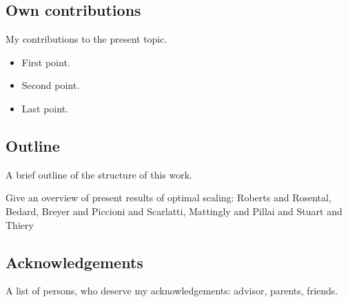 \subsection*{Own contributions}

My contributions to the present topic.
\begin{itemize}
 \item First point.
 \item Second point.
 \item Last point.
\end{itemize}


\subsection*{Outline}

A brief outline of the structure of this work.

Give an overview of present results of optimal scaling: Roberts and Rosental, Bedard, Breyer and Piccioni and Scarlatti, Mattingly and Pillai and Stuart and Thiery

\subsection*{Acknowledgements}

A list of persons, who deserve my acknowledgements: advisor, parents, friends.



